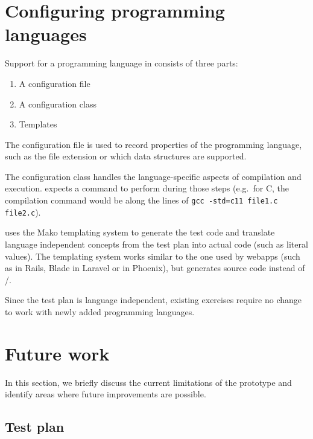\documentclass[5p,number]{elsarticle}
\begin{document}
    \section{Configuring programming languages}\label{sec:configuring-programming-languages}

    Support for a programming language in \tested{} consists of three parts:

    \begin{enumerate}
        \item A configuration file
        \item A configuration class
        \item Templates
    \end{enumerate}

    The configuration file is used to record properties of the programming language, such as the file extension or which data structures are supported.

    The configuration class handles the language-specific aspects of compilation and execution.
    \tested{} expects a command to perform during those steps (e.g.\ for C, the compilation command would be along the lines of \texttt{gcc -std=c11 file1.c file2.c}).
    
    \tested{} uses the Mako templating system \cite{mako} to generate the test code and translate language independent concepts from the test plan into actual code (such as literal values).
    The templating system works similar to the one used by webapps (such as  in Rails, Blade in Laravel or  in Phoenix), but generates source code instead of /.
    
    Since the test plan is language independent, existing exercises require no change to work with newly added programming languages.
    
    \section{Future work}\label{sec:future-work}
    
    In this section, we briefly discuss the current limitations of the prototype and identify areas where future improvements are possible.
    
    \subsection{Test plan}\label{subsec:test-plan}
\end{document}
